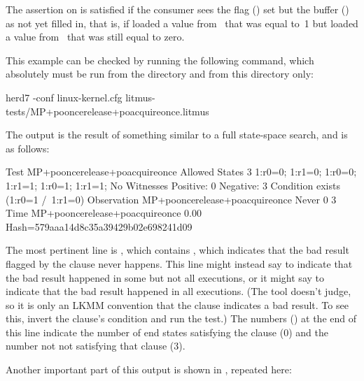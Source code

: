 \begin{fcvref}
The  assertion on  is satisfied if the consumer
sees the flag () set but the buffer () as not yet filled in,
that is, if  loaded a value from~ that was equal to~1
but loaded a value from~ that was still equal to zero.
\end{fcvref}

This example can be checked by running the following command, which
absolutely must be run from the  directory and from
this directory only:

\begin{VerbatimU}[breaklines=true]
herd7 -conf linux-kernel.cfg litmus-tests/MP+pooncerelease+poacquireonce.litmus
\end{VerbatimU}

The output is the result of something similar to a full state-space
search, and is as follows:

\begin{fcvlabel}
\begin{VerbatimN}[commandchars=\%\@\$]
	Test MP+pooncerelease+poacquireonce Allowed  %
	States 3          %
	1:r0=0; 1:r1=0;
	1:r0=0; 1:r1=1;
	1:r0=1; 1:r1=1;   %
	No                %
	Witnesses         %
	Positive: 0 Negative: 3    %
	Condition exists (1:r0=1 /\ 1:r1=0)   %
	Observation MP+pooncerelease+poacquireonce Never 0 3   %
	Time MP+pooncerelease+poacquireonce 0.00   %
	Hash=579aaa14d8c35a39429b02e698241d09      %
\end{VerbatimN}
\end{fcvlabel}

\begin{fcvref}
The most pertinent line is , which contains , which
indicates that the bad result flagged by the  clause never
happens.
This line might instead say  to indicate that the
bad result happened in some but not all executions, or it might say
 to indicate that the bad result happened in all executions.
(The  tool doesn't judge, so it is only an LKMM convention that the
 clause indicates a bad result.
To see this, invert the  clause's condition and run the test.)
The numbers () at the end of this line indicate the number of end
states satisfying the  clause (0) and the number not not
satisfying that clause (3).

Another important part of this output is shown in ,
repeated here:
\end{fcvref}

